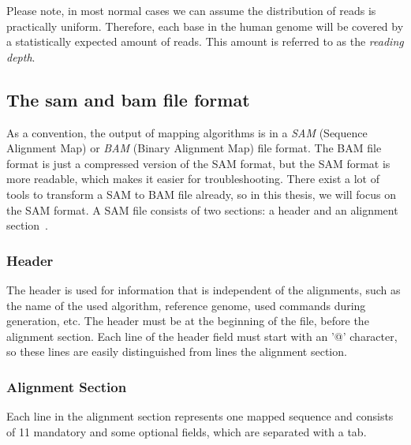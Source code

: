 Please note, in most normal cases we can assume the distribution of reads is practically uniform. Therefore, each base in the human genome will be covered by a statistically expected amount of reads. This amount is referred to as the \emph{reading depth}.


\subsection{The sam and bam file format}
\label{expl:SAM}

As a convention, the output of mapping algorithms is in a \emph{SAM} (Sequence Alignment Map) or \emph{BAM} (Binary Alignment Map) file format. The BAM file format is just a compressed version of the SAM format, but the SAM format is more readable, which makes it easier for troubleshooting. There exist a lot of tools to transform a SAM to BAM file already, so in this thesis, we will focus on the SAM format. A SAM file consists of two sections: a header and an alignment section~\cite{SAM}.


\subsubsection{Header}
The header is used for information that is independent of the alignments, such as the name of the used algorithm, reference genome, used commands during generation, etc.
The header must be at the beginning of the file, before the alignment section. Each line of the header field must start with an '@' character, so these lines are easily distinguished from lines the alignment section.

\subsubsection{Alignment Section}
Each line in the alignment section represents one mapped sequence and consists of 11 mandatory and some optional fields, which are separated with a tab.

